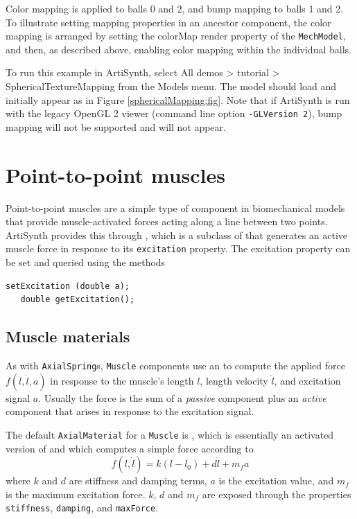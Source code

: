 Color mapping is applied to balls 0 and 2, and bump mapping to balls 1
and 2. To illustrate setting mapping properties in an ancestor
component, the color mapping is arranged by setting the {\sf colorMap}
render property of the {\tt MechModel}, and then, as described above,
enabling color mapping within the individual balls.

To run this example in ArtiSynth, select {\sf All demos > tutorial >
SphericalTextureMapping} from the {\sf Models} menu. The model should
load and initially appear as in Figure
\ref{sphericalMapping:fig}. Note that if ArtiSynth is run with the
legacy OpenGL 2 viewer (command line option {\tt -GLVersion 2}), bump
mapping will not be supported and will not appear.

\section{Point-to-point muscles}
\label{PointToPointMuscles:sec}

Point-to-point muscles are a simple type of component in biomechanical
models that provide muscle-activated forces acting along a line
between two points. ArtiSynth provides this through
, which is a subclass of
 that generates an
active muscle force in response to its {\tt excitation} property. The
excitation property can be set and queried using the methods
%
\begin{lstlisting}[]
   setExcitation (double a);
   double getExcitation();
\end{lstlisting}
%

\subsection{Muscle materials}
\label{sec:mechii:musclematerials}

As with {\tt AxialSpring}s, {\tt Muscle} components use an
 to compute the
applied force $f (l, \dot l, a)$ in response to the muscle's length
$l$, length velocity $\dot l$, and excitation signal $a$.  Usually the
force is the sum of a {\it passive} component plus an {\it active}
component that arises in response to the excitation signal.

The default {\tt AxialMaterial} for a {\tt Muscle} is
,
which is essentially an activated version of 
and 
which computes a simple force according to
%
\begin{equation}
f(l, \dot l) = k (l-l_0) + d \dot l + m_f a
\end{equation}
%
where $k$ and $d$ are stiffness and damping terms, $a$ is the
excitation value, and $m_f$ is the maximum excitation force.
$k$, $d$ and $m_f$ are exposed through the properties {\tt
stiffness}, {\tt damping}, and {\tt maxForce}.

